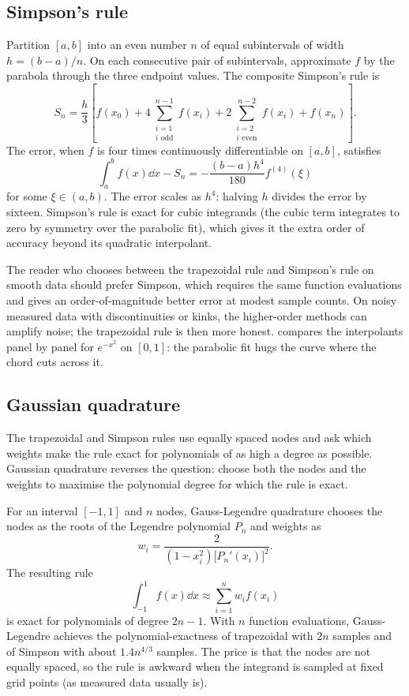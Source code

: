 \subsection{Simpson's rule}

Partition $[a,b]$ into an even number $n$ of equal subintervals of
width $h = (b-a)/n$. On each consecutive pair of subintervals,
approximate $f$ by the parabola through the three endpoint values.
The composite Simpson's rule is
\[
S_{n} = \frac{h}{3}\left[ f(x_{0}) + 4 \sum_{\substack{i=1 \\
i \text{ odd}}}^{n-1} f(x_{i}) + 2 \sum_{\substack{i=2 \\
i \text{ even}}}^{n-2} f(x_{i}) + f(x_{n})\right].
\]
The error, when $f$ is four times continuously differentiable on
$[a,b]$, satisfies
\[
\int_{a}^{b} f(x) \dd x - S_{n} = -\frac{(b-a) h^{4}}{180}
f^{(4)}(\xi)
\]
for some $\xi \in (a,b)$. The error scales as $h^{4}$: halving $h$
divides the error by sixteen. Simpson's rule is exact for cubic
integrands (the cubic term integrates to zero by symmetry over the
parabolic fit), which gives it the extra order of accuracy beyond
its quadratic interpolant.

The reader who chooses between the trapezoidal rule and Simpson's
rule on smooth data should prefer Simpson, which requires the same
function evaluations and gives an order-of-magnitude better error at
modest sample counts. On noisy measured data with discontinuities or
kinks, the higher-order methods can amplify noise; the trapezoidal
rule is then more honest.
 compares the interpolants
panel by panel for $e^{-x^{2}}$ on $[0, 1]$: the parabolic fit hugs
the curve where the chord cuts across it.



\subsection{Gaussian quadrature}

The trapezoidal and Simpson rules use equally spaced nodes and ask
which weights make the rule exact for polynomials of as high a
degree as possible. Gaussian quadrature reverses the question: choose
both the nodes and the weights to maximise the polynomial degree for
which the rule is exact.

For an interval $[-1, 1]$ and $n$ nodes, Gauss-Legendre quadrature
chooses the nodes as the roots of the Legendre polynomial $P_{n}$
and weights as
\[
w_{i} = \frac{2}{(1 - x_{i}^{2})\bigl[P_{n}'(x_{i})\bigr]^{2}}.
\]
The resulting rule
\[
\int_{-1}^{1} f(x) \dd x \approx \sum_{i=1}^{n} w_{i} f(x_{i})
\]
is exact for polynomials of degree $2n - 1$. With $n$ function
evaluations, Gauss-Legendre achieves the polynomial-exactness of
trapezoidal with $2n$ samples and of Simpson with about
$1.4n^{4/3}$ samples. The price is that the nodes are not equally
spaced, so the rule is awkward when the integrand is sampled at
fixed grid points (as measured data usually is).

